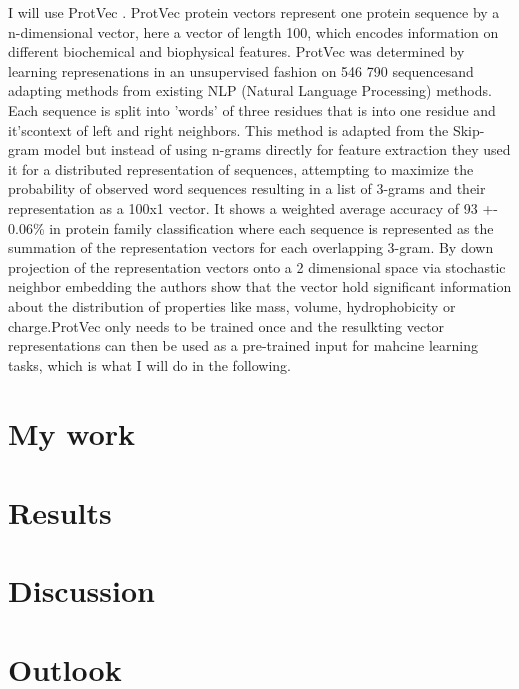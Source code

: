\documentclass{article}
\begin{document}
I will use ProtVec \cite{ProtVec}. ProtVec protein vectors represent one protein sequence by a n-dimensional vector, here a vector of length 100, which encodes information on different biochemical and biophysical features. ProtVec was determined by learning represenations in an unsupervised fashion on 546 790 sequencesand adapting methods from existing NLP (Natural Language Processing) methods. Each sequence is split into 'words' of three residues that is into one residue and it'scontext of left and right neighbors. This method is adapted from the Skip-gram model but instead of using n-grams directly for feature extraction they used it for a distributed representation of sequences, attempting to maximize the probability of observed word sequences resulting in a list of 3-grams and their representation as a 100x1 vector. It shows a weighted average accuracy of 93 +- 0.06\% in protein family classification where each sequence is represented as the summation of the representation vectors for each overlapping 3-gram. By down projection of the representation vectors onto a 2 dimensional space via stochastic neighbor embedding the authors show that the vector hold significant information about the distribution of properties like mass, volume, hydrophobicity or charge.ProtVec only needs to be trained once and the resulkting vector representations can then be used as a pre-trained input for mahcine learning tasks, which is what I will do in the following.


\section{My work}
\section{Results}
\section{Discussion}
\section{Outlook}

\end{document}
